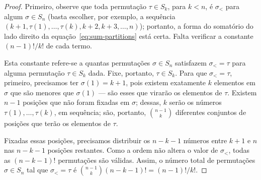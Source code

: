\begin{proof}
    Primeiro,
    observe que toda permutação $\tau \in S_k$, para $k < n$,
    é $\sigma_<$ para algum $\sigma \in S_n$
    (basta escolher, por exemplo,
    a sequência $(k+1, \tau(1), \dots, \tau(k), k+2, k+3, \dots, n)$);
    portanto,
    a forma do somatório do lado direito da equação~\ref{eq:sum-partitions} está certa.
    Falta verificar a constante $(n-1)!/k!$ de cada termo.

    Esta constante refere-se a quantas permutações $\sigma \in S_n$
    satisfazem $\sigma_< = \tau$ para alguma permutação $\tau \in S_k$ dada.
    Fixe, portanto, $\tau \in S_k$.
    Para que $\sigma_< = \tau$,
    primeiro, precisamos ter $\sigma(1) = k+1$,
    pois existem exatamente $k$ elementos em $\sigma$ que são menores que $\sigma(1)$
    --- são esses que virarão os elementos de $\tau$.
    Existem $n-1$ posições que não foram fixadas em $\sigma$;
    dessas, $k$ serão os números $\tau(1), \dots, \tau(k)$,
    em sequência;
    são, portanto, $\binom{n-1}{k}$ diferentes conjuntos de posições
    que terão os elementos de $\tau$.

    Fixadas essas posições,
    precisamos distribuir os $n - k - 1$ números entre $k+1$ e $n$
    nas $n - k - 1$ posições restantes.
    Como a ordem não altera o valor de $\sigma_<$,
    todas as $(n - k - 1)!$ permutações são válidas.
    Assim, o número total de permutações $\sigma \in S_n$
    tal que $\sigma_< = \tau$ é $\binom{n-1}{k} (n-k-1)! = (n-1)!/k!$.
\end{proof}
